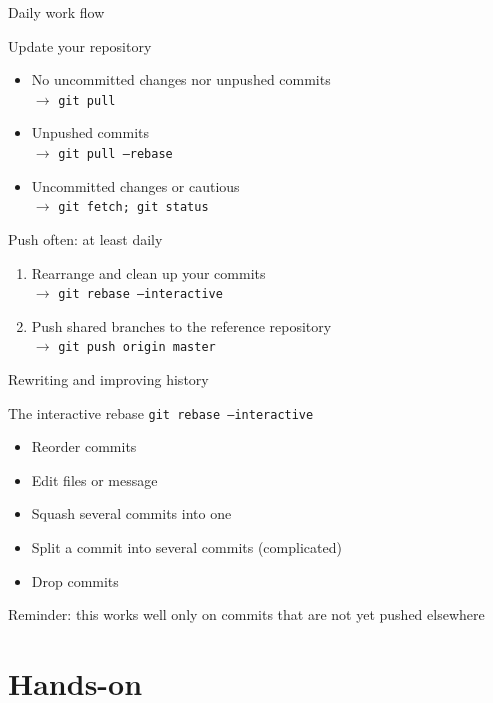 \documentclass{beamer}
\begin{document}
\begin{frame}{Daily work flow}
  \begin{block}{Update your repository}
    \begin{itemize}
    \item No uncommitted changes nor unpushed commits\\$\rightarrow$ \texttt{git pull}
    \item Unpushed commits\\$\rightarrow$ \texttt{git pull --rebase}
    \item Uncommitted changes or cautious\\$\rightarrow$ \texttt{git fetch; git status}
    \end{itemize}
  \end{block}
  \begin{block}{Push often: at least daily}
    \begin{enumerate}
    \item Rearrange and clean up your commits\\$\rightarrow$ \texttt{git rebase --interactive}
    \item Push shared branches to the reference repository\\$\rightarrow$ \texttt{git push origin master}
    \end{enumerate}
  \end{block}
\end{frame}

\begin{frame}{Rewriting and improving history}
  \begin{block}{The interactive rebase}
    \texttt{git rebase --interactive}
    \begin{itemize}
    \item Reorder commits
    \item Edit files or message
    \item Squash several commits into one
    \item Split a commit into several commits (complicated)
    \item Drop commits
    \end{itemize}
    Reminder: this works well only on commits that are \alert{not yet pushed} elsewhere
  \end{block}
\end{frame}

\section{Hands-on}
\end{document}
